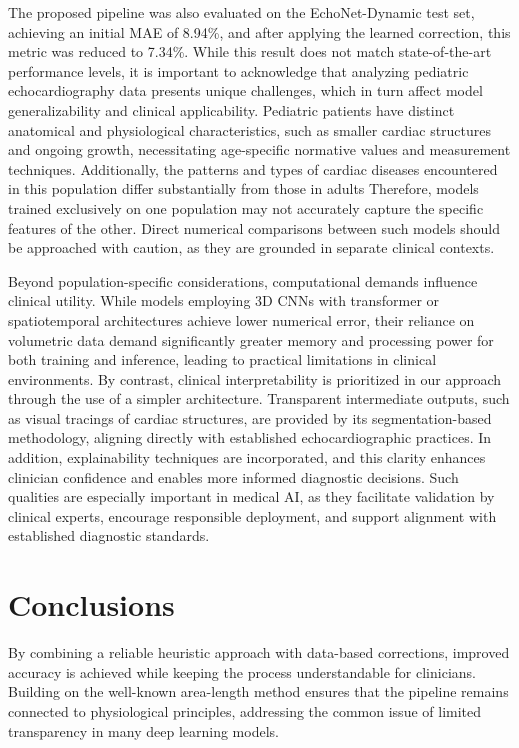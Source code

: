 \documentclass[runningheads]{llncs}
\begin{document}
The proposed pipeline was also evaluated on the EchoNet-Dynamic test set, achieving an initial MAE of 8.94\%, and after applying the learned correction, this metric was reduced to 7.34\%. While this result does not match state-of-the-art performance levels, it is important to acknowledge that analyzing pediatric echocardiography data presents unique challenges, which in turn affect model generalizability and clinical applicability. Pediatric patients have distinct anatomical and physiological characteristics, such as smaller cardiac structures and ongoing growth, necessitating age-specific normative values and measurement techniques. Additionally, the patterns and types of cardiac diseases encountered in this population differ substantially from those in adults Therefore, models trained exclusively on one population may not accurately capture the specific features of the other. Direct numerical comparisons between such models should be approached with caution, as they are grounded in separate clinical contexts.

Beyond population-specific considerations, computational demands influence clinical utility. While models employing 3D CNNs with transformer or spatiotemporal architectures achieve lower numerical error, their reliance on volumetric data demand significantly greater memory and processing power for both training and inference, leading to practical limitations in clinical environments. By contrast, clinical interpretability is prioritized in our approach through the use of a simpler architecture. Transparent intermediate outputs, such as visual tracings of cardiac structures, are provided by its segmentation-based methodology, aligning directly with established echocardiographic practices. In addition, explainability techniques are incorporated, and this clarity enhances clinician confidence and enables more informed diagnostic decisions. Such qualities are especially important in medical AI, as they facilitate validation by clinical experts, encourage responsible deployment, and support alignment with established diagnostic standards.

\section{Conclusions}



By combining a reliable heuristic approach with data-based corrections,  improved accuracy is achieved while keeping the process understandable for clinicians. Building on the well-known area-length method ensures that the pipeline remains connected to physiological principles, addressing the common issue of limited transparency in many deep learning models.
\end{document}
